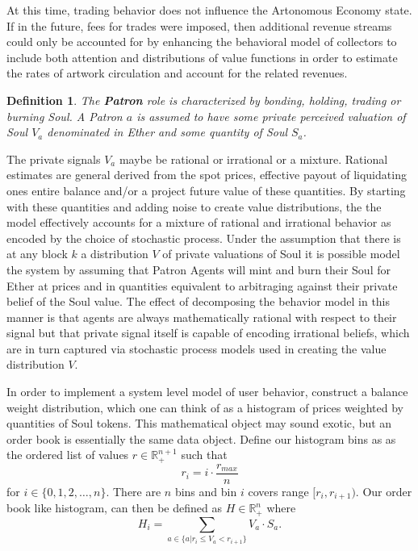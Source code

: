 \documentclass[11pt]{amsart}
\newtheorem{definition}{Definition}
\begin{document}
At this time, trading behavior does not influence the Artonomous Economy state. If in the future, fees for trades were imposed, then additional revenue streams could only be accounted for by enhancing the behavioral model of collectors to include both attention and distributions of value functions in order to estimate the rates of artwork circulation and account for the related revenues.

\begin{definition}
The \textbf{Patron} role is characterized by bonding, holding, trading or burning Soul.  A Patron $a$ is assumed to have some private perceived valuation of Soul $V_a$ denominated in Ether and some quantity of Soul $S_a$.  
\end{definition}

The private signals $V_a$ maybe be rational or irrational or a mixture. Rational estimates are general derived from the spot prices, effective payout of liquidating ones entire balance and/or a project future value of these quantities. By starting with these quantities and adding noise to create value distributions, the the model effectively accounts for a mixture of rational and irrational behavior as encoded by the choice of stochastic process. Under the assumption that there is at any block $k$ a distribution $V$ of private valuations of Soul it is possible model the system by assuming that Patron Agents will  mint and burn their Soul for Ether at prices and in quantities equivalent to arbitraging against their private belief of the Soul value. The effect of decomposing the behavior model in this manner is that agents are always mathematically rational with respect to their signal but that private signal itself is capable of encoding irrational beliefs, which are in turn captured via stochastic process models used in creating the value distribution $V$.

In order to implement a system level model of user behavior, construct a balance weight distribution, which one can think of as a histogram of prices weighted by quantities of Soul tokens. This mathematical object may sound exotic, but an order book is essentially the same data object. Define our histogram bins as as the ordered list of values $r\in\mathbb{R}_+^{n+1}$ such that 
\begin{equation}
r_i = i \cdot \frac{r_{max}}{n}
\end{equation}
for $i \in \{0,1,2,\ldots, n\}$. There are $n$ bins and bin $i$ covers range $[r_i, r_{i+1})$. Our order book like histogram, can then be defined as $H\in\mathbb{R}_+^n$ where 
\begin{equation}
H_i = \sum_{a\in \{a | r_i\le V_a < r_{i+1}\}  } V_a \cdot S_a.
\end{equation}
\end{document}
